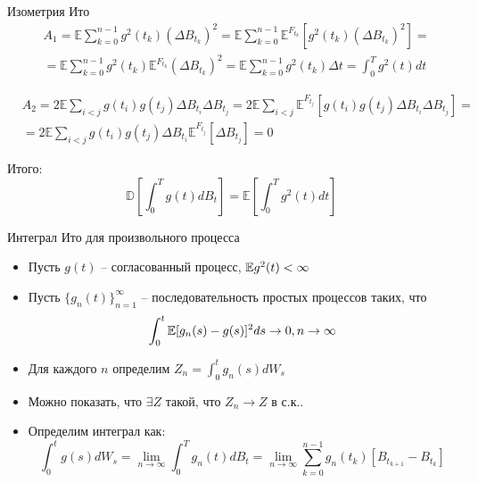 \documentclass{beamer}
\begin{document}
\begin{frame}{Изометрия Ито}
    \begin{align*}
        &A_1 = \mathbb{E} \sum_{k=0}^{n-1} g^2(t_k) \left(\Delta B_{t_k}\right)^2 = 
        \mathbb{E} \sum_{k=0}^{n-1} \mathbb{E}^{F_{t_k}} \left[g^2(t_k) \left(\Delta B_{t_k}\right)^2 \right] 
        = \\ 
        & = \mathbb{E} \sum_{k=0}^{n-1} g^2(t_k) \mathbb{E}^{F_{t_k}} \left(\Delta B_{t_k}\right)^2 = \mathbb{E} \sum_{k=0}^{n-1} g^2(t_k) \Delta t = \int_0^T g^2(t) dt 
    \end{align*}
     
    \begin{align*}
        &A_2 = 2 \mathbb{E} \sum_{i < j} g(t_i)g(t_j) \Delta B_{t_i} \Delta B_{t_j} =
        2 \mathbb{E} \sum_{i < j} \mathbb{E}^{F_{t_j}} \left[g(t_i)g(t_j) \Delta B_{t_i} \Delta B_{t_j}\right] = \\
        &= 2 \mathbb{E} \sum_{i < j} g(t_i)g(t_j) \Delta B_{t_i} \mathbb{E}^{F_{t_j}} \left[ \Delta B_{t_j}\right] = 0
    \end{align*}
     
    Итого:
    $$ \mathbb{D} \left[ \int_0^T g(t) dB_t \right] = \mathbb{E} \left[\int_0^T g^2(t) dt\right]$$
\end{frame}


\begin{frame}{Интеграл Ито для произвольного процесса}
    \begin{itemize}
        \item Пусть $g(t)$ -- согласованный процесс, $\mathbb{E} g^2(t) < \infty$
        \item Пусть $\{g_n(t)\}_{n=1}^{\infty}$ -- последовательность простых процессов таких, что 
        $$
            \int_0^t \mathbb{E} [g_n(s)-g(s)]^2 ds \to 0, n \to \infty
        $$
        \item Для каждого $n$ определим $Z_n = \int_0^t g_n(s)dW_s$

        \item Можно показать, что $\exists Z$ такой, что $Z_n \to Z$ в с.к.. 
        
        \item Определим интеграл как:
        $$
            \int_0^t g(s)dW_s =  \lim_{n\to \infty}\int_0^T g_n(t) dB_t = \lim_{n \to \infty} \sum_{k=0}^{n-1} g_n(t_k)\left[B_{t_{k+1}} - B_{t_k}\right]
        $$
    \end{itemize}
\end{frame}
\end{document}
